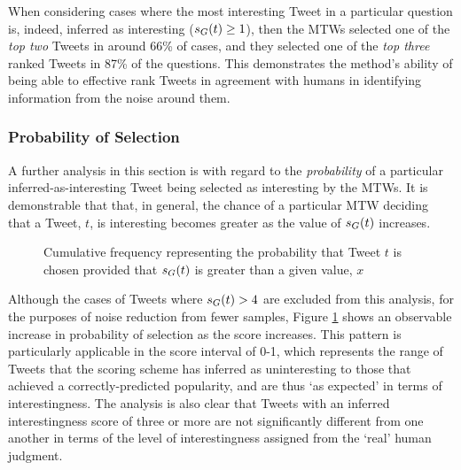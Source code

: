 
When considering cases where the most interesting Tweet in a particular question is, indeed, inferred as interesting ($s_G(t) \geq 1$), then the MTWs selected one of the \textit{top two} Tweets in around 66\% of cases, and they selected one of the \textit{top three} ranked Tweets in 87\% of the questions. This demonstrates the method's ability of being able to effective rank Tweets in agreement with humans in identifying information from the noise around them.


\subsubsection{Probability of Selection}
A further analysis in this section is with regard to the \textit{probability} of a particular inferred-as-interesting Tweet being selected as interesting by the MTWs. It is demonstrable that that, in general, the chance of a particular MTW deciding that a Tweet, $t$, is interesting becomes greater as the value of $s_G(t)$ increases.

\begin{figure}[h]
\centering
{}
\caption{Cumulative frequency representing the probability that Tweet $t$ is chosen provided that $s_G(t)$ is greater than a given value, $x$}
\label{fig:score-cum-dist}
\end{figure}

Although the cases of Tweets where $s_G(t) > 4$ are excluded from this analysis, for the purposes of noise reduction from fewer samples, Figure \ref{fig:score-cum-dist} shows an observable increase in probability of selection as the score increases. This pattern is particularly applicable in the score interval of 0-1, which represents the range of Tweets that the scoring scheme has inferred as uninteresting to those that achieved a correctly-predicted popularity, and are thus `as expected' in terms of interestingness. The analysis is also clear that Tweets with an inferred interestingness score of three or more are not significantly different from one another in terms of the level of interestingness assigned from the `real' human judgment.



